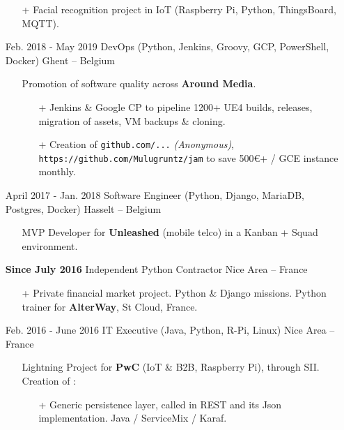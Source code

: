 \documentclass{res}
\begin{document}
\begin{resume}
\begin{itemize}
\begin{itemize}
                        \item[+] Facial recognition project in IoT (Raspberry Pi, Python, ThingsBoard, MQTT).
					\end{itemize}
					\item[] Feb.  2018 - May 2019 \tabto{5cm} DevOps (Python, Jenkins, Groovy, GCP, PowerShell, Docker) \hfill Ghent -- Belgium
					\begin{itemize}
                        \item[] Promotion of software quality across \textbf{Around Media}.
                        \begin{itemize}
                            \item[+] Jenkins \& Google CP to pipeline 1200+ UE4 builds, releases, migration of assets, VM backups \& cloning.
                            \item[+] Creation of \ifisanon \texttt{github.com/...} \textit{(Anonymous)}, \else \texttt{https://github.com/Mulugruntz/jam} \fi to save 500\euro+ / GCE instance monthly.
                        \end{itemize}
					\end{itemize}
					\item[] April 2017 - Jan. 2018 \tabto{5cm} Software Engineer (Python, Django, MariaDB, Postgres, Docker) \hfill Hasselt -- Belgium
					\begin{itemize}
						\item[] MVP Developer for  \textbf{Unleashed} (mobile telco) in a Kanban + Squad environment.
					\end{itemize}
					\item[] \textbf{Since July 2016} \tabto{5cm} Independent Python Contractor \hfill Nice Area -- France
					\begin{itemize}
						\item[+] Private financial market project. Python \& Django missions. Python trainer for \textbf{AlterWay}, St Cloud, France.
					\end{itemize}
					\item[] Feb. 2016 - June 2016 \tabto{5cm} IT Executive (Java, Python, R-Pi, Linux) \hfill Nice Area -- France
					\begin{itemize}
						\item[] Lightning Project for \textbf{PwC} (IoT \& B2B, Raspberry Pi), through SII. Creation of :
						\begin{itemize}
							\item[+] Generic persistence layer, called in REST and its Json implementation. Java / ServiceMix / Karaf.

\end{itemize}
\end{itemize}
\end{itemize}
\end{resume}
\end{document}
